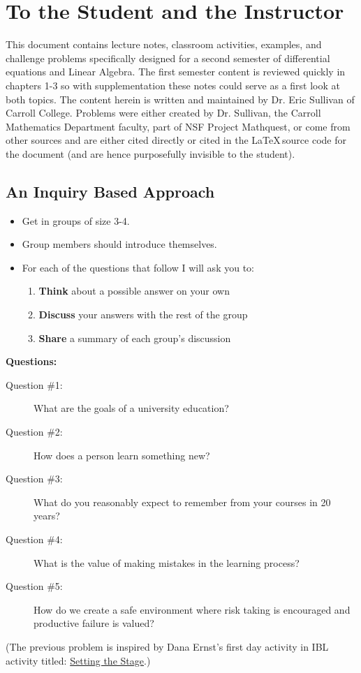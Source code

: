 \setcounter{chapter}{-1}
\chapter{To the Student and the Instructor}
This document contains lecture notes, classroom activities, examples, and challenge
problems specifically designed for a second semester of differential equations and Linear
Algebra.  The first semester content is reviewed quickly in chapters 1-3 so with
supplementation these notes could serve as a first look at both topics.  The content
herein is written and maintained by Dr. Eric Sullivan of Carroll College.  Problems were
either created by Dr. Sullivan, the Carroll Mathematics Department faculty, part of NSF
Project Mathquest, or come from other sources and are either cited directly or cited in
the \LaTeX\,source code for the document (and are hence purposefully invisible to the
student).


\section{An Inquiry Based Approach}
\begin{problem}
    \begin{itemize}
        \item Get in groups of size 3-4.
        \item Group members should introduce themselves.
        \item For each of the questions that follow I will ask you to:
            \begin{enumerate}
                \item {\bf Think} about a possible answer on your own
                \item {\bf Discuss} your answers with the rest of the group
                \item {\bf Share} a summary of each group's discussion
            \end{enumerate}
    \end{itemize}
    {\bf Questions:} 
    \begin{description}
        \item[Question \#1:] What are the goals of a university education?
        \item[Question \#2:] How does a person learn something new?
        \item[Question \#3:] What do you reasonably expect to remember from your courses
            in 20 years?
        \item[Question \#4:] What is the value of making mistakes in the learning process?
        \item[Question \#5:] How do we create a safe environment where risk taking is
            encouraged and productive failure is valued?
    \end{description}
\end{problem}
(The previous problem is inspired by Dana Ernst's first day activity in IBL activity
titled: 
\href{http://danaernst.com/setting-the-stage/}{Setting the Stage}.)

